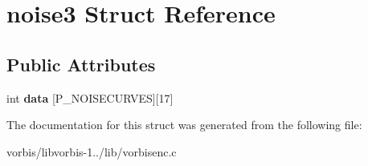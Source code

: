 \hypertarget{structnoise3}{\section{noise3 Struct Reference}
\label{structnoise3}
}
\subsection*{Public Attributes}
\begin{DoxyCompactItemize}
\item 
\hypertarget{structnoise3_a43d278adceb5aa18af0b06faf51aa544}{int {\bfseries data} \mbox{[}P\+\_\+\+N\+O\+I\+S\+E\+C\+U\+R\+V\+E\+S\mbox{]}\mbox{[}17\mbox{]}}\label{structnoise3_a43d278adceb5aa18af0b06faf51aa544}

\end{DoxyCompactItemize}


The documentation for this struct was generated from the following file\+:\begin{DoxyCompactItemize}
\item 
vorbis/libvorbis-\/1../lib/vorbisenc.\+c\end{DoxyCompactItemize}
